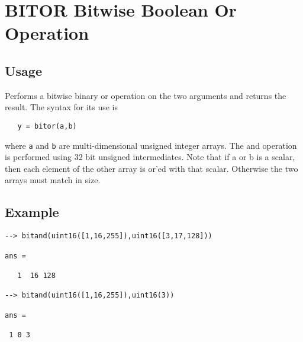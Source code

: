 \section{BITOR Bitwise Boolean Or Operation}

\subsection{Usage}

Performs a bitwise binary or operation on the two arguments and
returns the result.  The syntax for its use is
\begin{verbatim}
   y = bitor(a,b)
\end{verbatim}
where \verb|a| and \verb|b| are multi-dimensional unsigned integer arrays.
The and operation is performed using 32 bit unsigned intermediates.  Note that if a
or b is a scalar, then each element of the other array is or'ed with
that scalar.  Otherwise the two arrays must match in size.
\subsection{Example}

\begin{verbatim}
--> bitand(uint16([1,16,255]),uint16([3,17,128]))

ans = 

   1  16 128 

--> bitand(uint16([1,16,255]),uint16(3))

ans = 

 1 0 3 
\end{verbatim}
